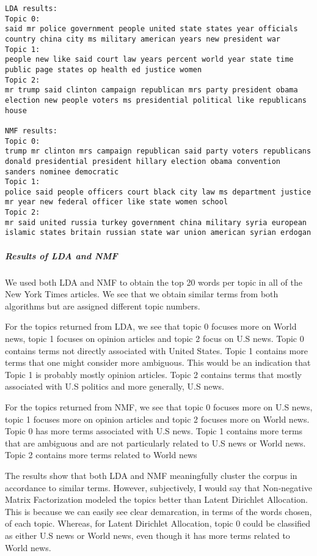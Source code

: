 \documentclass[11pt]{article}
\begin{document}
    \begin{Verbatim}[commandchars=\\\{\}]
LDA results:
Topic 0:
said mr police government people united state states year officials country china city ms military american years new president war
Topic 1:
people new like said court law years percent world year state time public page states op health ed justice women
Topic 2:
mr trump said clinton campaign republican mrs party president obama election new people voters ms presidential political like republicans house

NMF results:
Topic 0:
trump mr clinton mrs campaign republican said party voters republicans donald presidential president hillary election obama convention sanders nominee democratic
Topic 1:
police said people officers court black city law ms department justice mr year new federal officer like state women school
Topic 2:
mr said united russia turkey government china military syria european islamic states britain russian state war union american syrian erdogan

    \end{Verbatim}

    \subparagraph{Results of LDA and NMF}\label{results-of-lda-and-nmf}

We used both LDA and NMF to obtain the top 20 words per topic in all of
the New York Times articles. We see that we obtain similar terms from
both algorithms but are assigned different topic numbers.

For the topics returned from LDA, we see that topic 0 focuses more on
World news, topic 1 focuses on opinion articles and topic 2 focus on U.S
news. Topic 0 contains terms not directly associated with United States.
Topic 1 contains more terms that one might consider more ambiguous. This
would be an indication that Topic 1 is probably mostly opinion articles.
Topic 2 contains terms that mostly associated with U.S politics and more
generally, U.S news.

For the topics returned from NMF, we see that topic 0 focuses more on
U.S news, topic 1 focuses more on opinion articles and topic 2 focuses
more on World news. Topic 0 has more terms associated with U.S news.
Topic 1 contains more terms that are ambiguous and are not particularly
related to U.S news or World news. Topic 2 contains more terms related
to World news

The results show that both LDA and NMF meaningfully cluster the corpus
in accordance to similar terms. However, subjectively, I would say that
Non-negative Matrix Factorization modeled the topics better than Latent
Dirichlet Allocation. This is because we can easily see clear
demarcation, in terms of the words chosen, of each topic. Whereas, for
Latent Dirichlet Allocation, topic 0 could be classified as either U.S
news or World news, even though it has more terms related to World news.
\end{document}
